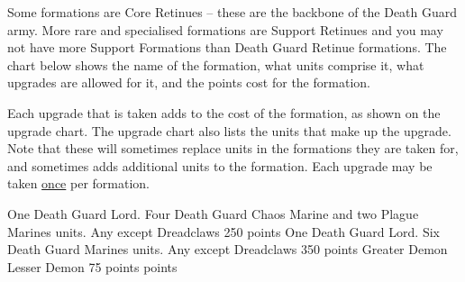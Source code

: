 \documentclass[a4paper, twocolumn]{article}
\begin{document}
Some formations are Core Retinues – these are the backbone
of the Death Guard army. More rare and specialised
formations are Support Retinues and you may not have more
Support Formations than Death Guard Retinue formations.
The chart below shows the name of the formation, what units
comprise it, what upgrades are allowed for it, and the points
cost for the formation.

Each upgrade that is taken adds to the cost of the formation,
as shown on the upgrade chart. The upgrade chart also lists
the units that make up the upgrade. Note that these will
sometimes replace units in the formations they are taken for,
and sometimes adds additional units to the formation. Each
upgrade may be taken \underline{once} per formation.


          {One Death Guard Lord. Four Death Guard Chaos Marine and two Plague Marines units.}
          {Any except Dreadclaws}
          {250 points}
          {One Death Guard Lord. Six Death Guard Marines units.}
          {Any except Dreadclaws}
          {350 points}
          {Greater Demon \newline Lesser Demon}
          {}
          {75 points  points}
\formationsEND
\end{document}
